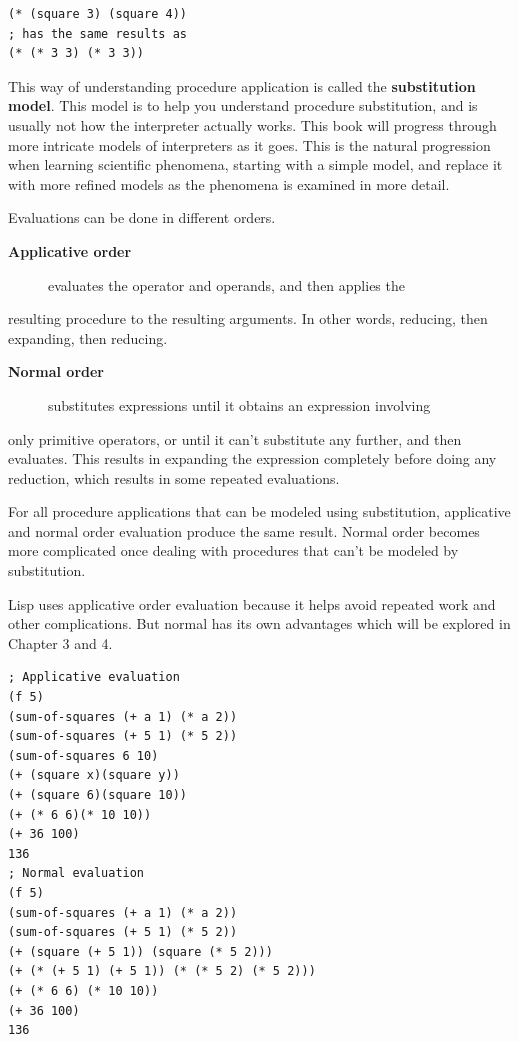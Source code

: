 \documentclass[final,fleqn,titlepage,twoside]{article}
\begin{document}
\begin{verbatim}
(* (square 3) (square 4))
; has the same results as
(* (* 3 3) (* 3 3))
\end{verbatim}

This way of understanding procedure application is called the \textbf{substitution
model}. This model is to help you understand procedure substitution, and is
usually not how the interpreter actually works. This book will progress through
more intricate models of interpreters as it goes. This is the natural
progression when learning scientific phenomena, starting with a simple model,
and replace it with more refined models as the phenomena is examined in more
detail.

Evaluations can be done in different orders.

\begin{description}
\item[{\textbf{Applicative order}}] evaluates the operator and operands, and then applies the
\end{description}
resulting procedure to the resulting arguments. In other words, reducing, then
expanding, then reducing.

\begin{description}
\item[{\textbf{Normal order}}] substitutes expressions until it obtains an expression involving
\end{description}
only primitive operators, or until it can't substitute any further, and then
evaluates. This results in expanding the expression completely before doing any
reduction, which results in some repeated evaluations.

For all procedure applications that can be modeled using substitution,
applicative and normal order evaluation produce the same result. Normal order
becomes more complicated once dealing with procedures that can't be modeled by
substitution.

Lisp uses applicative order evaluation because it helps avoid repeated work and
other complications. But normal has its own advantages which will be explored in
Chapter 3 and 4.

\begin{verbatim}
; Applicative evaluation
(f 5)
(sum-of-squares (+ a 1) (* a 2))
(sum-of-squares (+ 5 1) (* 5 2))
(sum-of-squares 6 10)
(+ (square x)(square y))
(+ (square 6)(square 10))
(+ (* 6 6)(* 10 10))
(+ 36 100)
136
; Normal evaluation
(f 5)
(sum-of-squares (+ a 1) (* a 2))
(sum-of-squares (+ 5 1) (* 5 2))
(+ (square (+ 5 1)) (square (* 5 2)))
(+ (* (+ 5 1) (+ 5 1)) (* (* 5 2) (* 5 2)))
(+ (* 6 6) (* 10 10))
(+ 36 100)
136
\end{verbatim}
\end{document}
